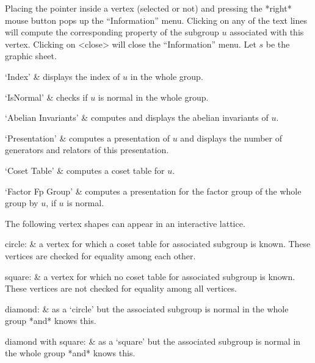 Placing the pointer  inside a vertex (selected  or not) and  pressing the
*right* mouse button pops up the ``Information''  menu.  Clicking on any of
the text  lines will compute the corresponding   property of the subgroup
$u$  associated  with this  vertex. Clicking  on <close>  will  close the
``Information'' menu.  Let $s$ be the graphic sheet.

\beginitems
`Index' &
displays  the index of  $u$ in the whole  group.

`IsNormal' &
checks  if $u$ is  normal  in the  whole group.

`Abelian Invariants' &
computes  and  displays  the  abelian invariants  of  $u$.

`Presentation' &
computes a presentation of $u$ and displays  the number of generators and
relators   of   this presentation.

`Coset Table' &
computes   a   coset table for   $u$.

`Factor Fp Group' &
computes a presentation  for the factor group  of the whole group by $u$,
if $u$ is normal.
\enditems



The following vertex shapes can appear in an interactive lattice.

\beginitems
circle: &
    a vertex for which  a coset table for  associated subgroup is  known.
    These vertices are checked for equality among each other.

square: &
    a vertex for which  no coset table for  associated subgroup is known.
    These vertices are not checked for equality among all vertices.

diamond: &
    as  a `circle' but   the associated subgroup  is  normal in the whole
    group *and* {\GAP} knows this.

diamond with square: &
    as a  `square'  but the associated subgroup  is  normal in  the whole
    group *and* {\GAP} knows this.
\enditems

